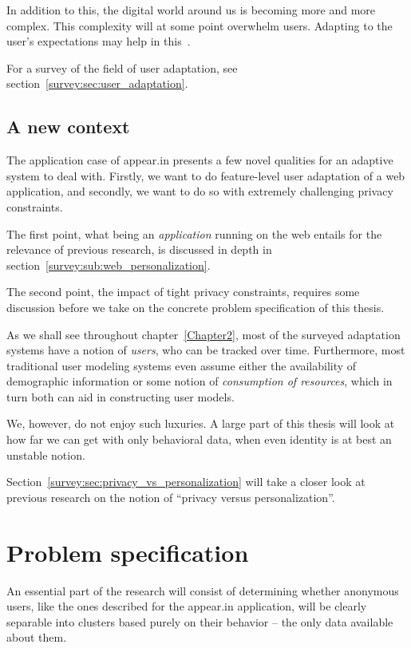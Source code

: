 In addition to this, the digital world around us is becoming more and more complex. This complexity will at some point overwhelm users. Adapting to the user's expectations may help in this~\cite{Vrieze}.

For a survey of the field of user adaptation, see section~\ref{survey:sec:user_adaptation}.

\subsection{A new context}
\label{intro:sub:adaptation_context}

The application case of appear.in presents a few novel qualities for an adaptive system to deal with. Firstly, we want to do feature-level user adaptation of a web application, and secondly, we want to do so with extremely challenging privacy constraints.

The first point, what being an \emph{application} running on the web entails for the relevance of previous research, is discussed in depth in section~\ref{survey:sub:web_personalization}.

The second point, the impact of tight privacy constraints, requires some discussion before we take on the concrete problem specification of this thesis.

As we shall see throughout chapter~\ref{Chapter2}, most of the surveyed adaptation systems have a notion of \emph{users}, who can be tracked over time. Furthermore, most traditional user modeling systems even assume either the availability of demographic information or some notion of \emph{consumption of resources}, which in turn both can aid in constructing user models.

We, however, do not enjoy such luxuries. A large part of this thesis will look at how far we can get with only behavioral data, when even identity is at best an unstable notion.

Section~\ref{survey:sec:privacy_vs_personalization} will take a closer look at previous research on the notion of ``privacy versus personalization''.

\section{Problem specification}
\label{intro:sec:problem_specification}

An essential part of the research will consist of determining whether anonymous users, like the ones described for the appear.in application, will be clearly separable into clusters based purely on their behavior -- the only data available about them.

